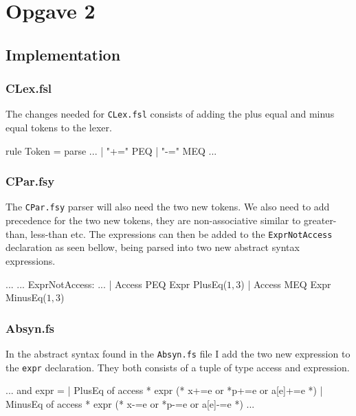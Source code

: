 \section{Opgave 2}
\subsection{Implementation}
\subsubsection*{CLex.fsl}
The changes needed for \texttt{CLex.fsl} consists of adding the plus equal and
minus equal tokens to the lexer.
\begin{ccode}
rule Token = parse
...
  | "+="            { PEQ }
  | "-="            { MEQ }
...
\end{ccode}
\subsubsection*{CPar.fsy}
The \texttt{CPar.fsy} parser will also need the two new tokens. We also need to
add precedence for the two new tokens, they are non-associative similar to
greater-than, less-than etc. The expressions can then be added to the
\texttt{ExprNotAccess} declaration as seen bellow, being parsed into two new
abstract syntax expressions.
\begin{ccode}
...
...
ExprNotAccess:
...
  | Access PEQ Expr                     { PlusEq($1, $3)      } 
  | Access MEQ Expr                     { MinusEq($1, $3)     } 

\end{ccode}
\subsubsection*{Absyn.fs}
In the abstract syntax found in the \texttt{Absyn.fs} file I add the two new
expression to the \texttt{expr} declaration. They both consists of a tuple of
type access and expression.
\begin{fs}
...
and expr =                                                         
  | PlusEq of access * expr          (* x+=e or *p+=e or a[e]+=e    *)
  | MinusEq of access * expr         (* x-=e or *p-=e or a[e]-=e    *)
...
\end{fs}

